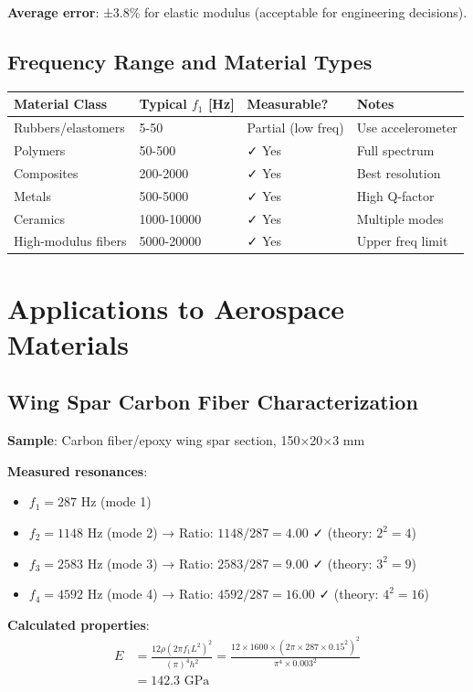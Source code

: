 \documentclass[12pt,a4paper]{article}
\begin{document}
\textbf{Average error}: ±3.8\% for elastic modulus (acceptable for engineering decisions).

\subsection{Frequency Range and Material Types}

\begin{center}
\begin{tabular}{|l|l|l|l|}
\hline
\textbf{Material Class} & \textbf{Typical $f_1$ [Hz]} & \textbf{Measurable?} & \textbf{Notes} \\
\hline
Rubbers/elastomers & 5-50 & Partial (low freq) & Use accelerometer \\
Polymers & 50-500 & ✓ Yes & Full spectrum \\
Composites & 200-2000 & ✓ Yes & Best resolution \\
Metals & 500-5000 & ✓ Yes & High Q-factor \\
Ceramics & 1000-10000 & ✓ Yes & Multiple modes \\
High-modulus fibers & 5000-20000 & ✓ Yes & Upper freq limit \\
\hline
\end{tabular}
\end{center}

\section{Applications to Aerospace Materials}

\subsection{Wing Spar Carbon Fiber Characterization}

\textbf{Sample}: Carbon fiber/epoxy wing spar section, 150×20×3 mm

\textbf{Measured resonances}:
\begin{itemize}
\item $f_1 = 287$ Hz (mode 1)
\item $f_2 = 1148$ Hz (mode 2) → Ratio: $1148/287 = 4.00$ ✓ (theory: $2^2 = 4$)
\item $f_3 = 2583$ Hz (mode 3) → Ratio: $2583/287 = 9.00$ ✓ (theory: $3^2 = 9$)
\item $f_4 = 4592$ Hz (mode 4) → Ratio: $4592/287 = 16.00$ ✓ (theory: $4^2 = 16$)
\end{itemize}

\textbf{Calculated properties}:
\begin{align}
E &= \frac{12\rho (2\pi f_1 L^2)^2}{(\pi)^4 h^2} = \frac{12 \times 1600 \times (2\pi \times 287 \times 0.15^2)^2}{\pi^4 \times 0.003^2} \\
&= 142.3 \text{ GPa}
\end{align}
\end{document}
